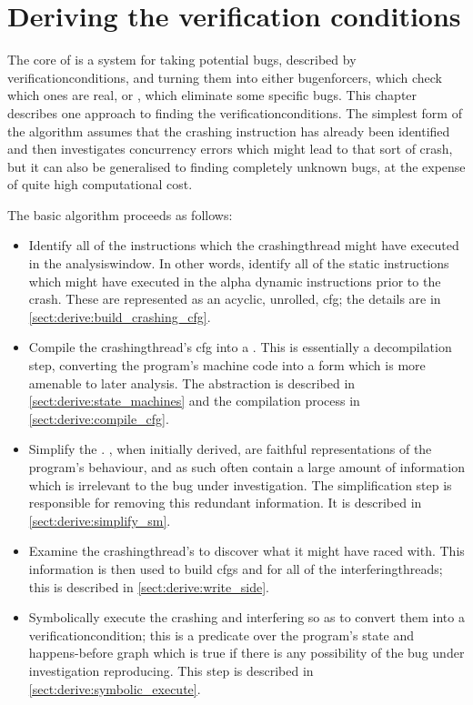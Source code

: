\chapter{Deriving the verification conditions}
\label{sect:derive}

The core of {\technique} is a system for taking potential bugs,
described by \glspl{verificationcondition}, and turning them into
either \glspl{bugenforcer}, which check which ones are real, or
{\genfixes}, which eliminate some specific bugs.  This chapter
describes one approach to finding the \glspl{verificationcondition}.
The simplest form of the algorithm assumes that the crashing
instruction has already been identified and then investigates
concurrency errors which might lead to that sort of crash, but it can
also be generalised to finding completely unknown bugs, at the expense
of quite high computational cost.

The basic algorithm proceeds as follows:

\begin{itemize}
\item Identify all of the instructions which the \gls{crashingthread}
  might have executed in the \gls{analysiswindow}.  In other words,
  identify all of the static instructions which might have executed in
  the \gls{alpha} dynamic instructions prior to the crash.  These are
  represented as an acyclic, unrolled, \gls{cfg}; the details are in
  \autoref{sect:derive:build_crashing_cfg}.
\item Compile the \gls{crashingthread}'s \gls{cfg} into a
  {\StateMachine}.  This is essentially a decompilation step,
  converting the program's machine code into a form which is more
  amenable to later analysis.  The {\StateMachine} abstraction is
  described in \autoref{sect:derive:state_machines} and the
  compilation process in \autoref{sect:derive:compile_cfg}.
\item Simplify the {\StateMachine}.  {\StateMachines}, when initially
  derived, are  faithful representations of the
  program's behaviour, and as such often contain a large amount of
  information which is irrelevant to the bug under investigation.  The
  simplification step is responsible for removing this redundant
  information.  It is described in \autoref{sect:derive:simplify_sm}.
\item Examine the \gls{crashingthread}'s {\StateMachine} to discover
  what it might have raced with.  This information is then used to
  build \glspl{cfg} and {\StateMachines} for all of the
  \glspl{interferingthread}; this is described in
  \autoref{sect:derive:write_side}.
\item Symbolically execute the crashing and interfering
  {\StateMachines} so as to convert them into a
  \gls{verificationcondition}; this is a predicate over the program's
  state and happens-before graph which is true if there is any
  possibility of the bug under investigation reproducing.  This step
  is described in \autoref{sect:derive:symbolic_execute}.
\end{itemize}

